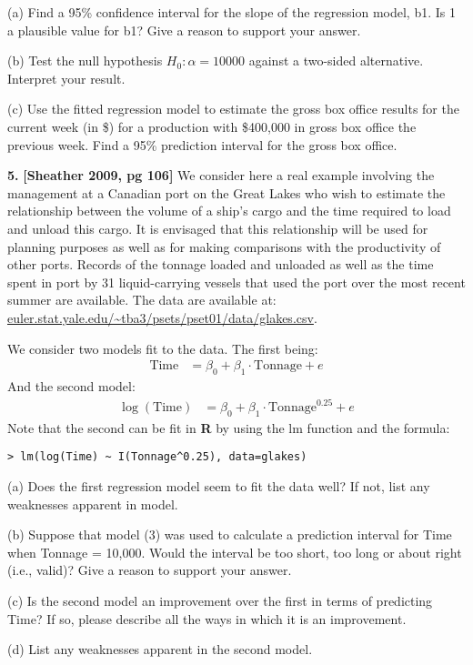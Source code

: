 \documentclass[12pt]{article}
\begin{document}
(a) Find a 95\% confidence interval for the slope of the regression model, b1. Is 1 a plausible value for b1? Give a reason to support your answer.

(b) Test the null hypothesis $H_0: \alpha =10000$ against a two-sided alternative. Interpret your result.

(c) Use the fitted regression model to estimate the gross box office results for the current week (in \$) for a production with \$400,000 in gross box office the previous week. Find a 95\% prediction interval for the gross box office.

{\bf 5.} {\bf [Sheather 2009, pg 106]} We consider here a real example involving
the management at a Canadian port on the Great Lakes who wish to estimate the relationship between
the volume of a ship’s cargo and the time required to load and unload this cargo. It is envisaged
that this relationship will be used for planning purposes as well as for making comparisons with
the productivity of other ports. Records of the tonnage loaded and unloaded as well as the time
spent in port by 31 liquid-carrying vessels that used the port over the most recent summer are
available. The data are available at: \url{euler.stat.yale.edu/~tba3/psets/pset01/data/glakes.csv}.

We consider two models fit to the data. The first being:
\begin{align}
\text{Time} &= \beta_0 + \beta_1 \cdot \text{Tonnage} + e
\end{align}
And the second model:
\begin{align}
\log(\text{Time}) &= \beta_0 + \beta_1 \cdot \text{Tonnage}^{0.25} + e
\end{align}
Note that the second can be fit in {\bf R} by using the lm function and
the formula:
\begin{verbatim}
> lm(log(Time) ~ I(Tonnage^0.25), data=glakes)
\end{verbatim}

(a) Does the first regression model seem to fit the data well?
If not, list any weaknesses apparent in model.

(b) Suppose that model (3) was used to calculate a prediction
interval for Time when Tonnage = 10,000. Would the interval be
too short, too long or about right (i.e., valid)? Give a reason
to support your answer.

(c) Is the second model an improvement over the first in terms of predicting Time?
If so, please describe all the ways in which it is an improvement.

(d) List any weaknesses apparent in the second model.
\end{document}
